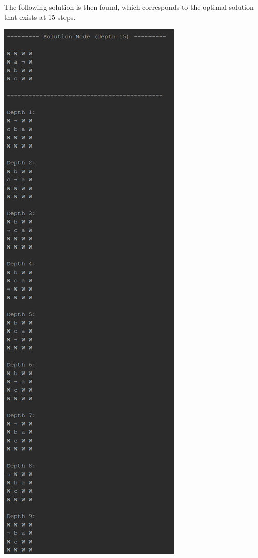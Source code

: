 \documentclass{article}
\begin{document}
	\newpage
	The following solution is then found, which corresponds to the optimal solution that exists at 15 steps.
	\begin{multicols}{2}[\columnsep=2cm]
		\includegraphics[height=0.8\textheight,keepaspectratio]{AStar-2-5-1.png}

\end{multicols}
\end{document}
